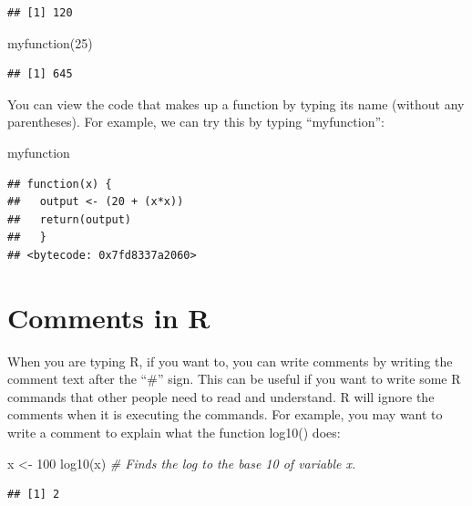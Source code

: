 \documentclass[
]{book}
\newenvironment{Shaded}{\begin{snugshade}}{\end{snugshade}}
\newcommand{\CommentTok}[1]{\textcolor[rgb]{0.56,0.35,0.01}{\textit{#1}}}
\newcommand{\DecValTok}[1]{\textcolor[rgb]{0.00,0.00,0.81}{#1}}
\newcommand{\FunctionTok}[1]{\textcolor[rgb]{0.00,0.00,0.00}{#1}}
\newcommand{\NormalTok}[1]{#1}
\newcommand{\OtherTok}[1]{\textcolor[rgb]{0.56,0.35,0.01}{#1}}
\begin{document}
\begin{verbatim}
## [1] 120
\end{verbatim}

\begin{Shaded}
\begin{Highlighting}[]
\FunctionTok{myfunction}\NormalTok{(}\DecValTok{25}\NormalTok{)}
\end{Highlighting}
\end{Shaded}

\begin{verbatim}
## [1] 645
\end{verbatim}

You can view the code that makes up a function by typing its name (without any parentheses). For example, we can try this by typing ``myfunction'':

\begin{Shaded}
\begin{Highlighting}[]
\NormalTok{myfunction}
\end{Highlighting}
\end{Shaded}

\begin{verbatim}
## function(x) { 
##   output <- (20 + (x*x)) 
##   return(output)
##   }
## <bytecode: 0x7fd8337a2060>
\end{verbatim}

\hypertarget{comments-in-r}{%
\section{Comments in R}\label{comments-in-r}}

When you are typing R, if you want to, you can write comments by writing the comment text after the ``\#'' sign. This can be useful if you want to write some R commands that other people need to read and understand. R will ignore the comments when it is executing the commands. For example, you may want to write a comment to explain what the function log10() does:

\begin{Shaded}
\begin{Highlighting}[]
\NormalTok{x }\OtherTok{\textless{}{-}} \DecValTok{100}
\FunctionTok{log10}\NormalTok{(x) }\CommentTok{\# Finds the log to the base 10 of variable x.}
\end{Highlighting}
\end{Shaded}

\begin{verbatim}
## [1] 2
\end{verbatim}
\end{document}

